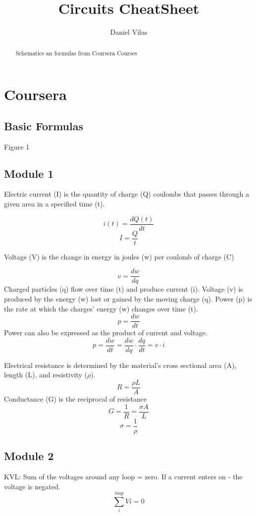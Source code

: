 \documentclass[]{article}
\title{Circuits CheatSheet}
\author{Daniel Vilas}
\begin{document}
\maketitle

\begin{abstract}
Schematics an formulas from Coursera Courses
\end{abstract}
\section{Coursera}
\subsection{Basic Formulas}

Figure 1

\subsection{Module 1}
Electric current (I) is the quantity of charge (Q) coulombs that passes through a given area in a specified time (t).

$$i(t)=\frac{dQ(t)}{dt}$$
$$I=\frac{Q}{t}$$

Voltage (V) is the change in energy in joules (w) per coulomb of charge (C)

$$v=\frac{dw}{dq}$$
Charged particles (q) flow over time (t) and produce current (i).
Voltage (v) is produced by the energy (w) lost or gained by the moving charge (q).
Power (p) is the rate at which the charges’ energy (w) changes over time (t).
$$p=\frac{dw}{dt}$$
Power can also be expressed as the product of current and voltage.
$$p=\frac{dw}{dt}=\frac{dw}{dq}\cdot\frac{dq}{dt}=v\cdot i$$

Electrical resistance is determined by the material’s cross sectional area (A), length (L), and resistivity ($\rho$).
$$R=\frac{\rho L}{A}$$
Conductance (G) is the reciprocal of resistance
$$G=\frac{1}{R}=\frac{\sigma A}{L}$$
$$\sigma = \frac{1}{\rho}$$


\subsection{Module 2}
KVL: Sum of the voltages around any loop = zero. If a current enters on - the voltage is negated.
$$\sum_{i}^{loop} Vi =0 $$
\end{document}
